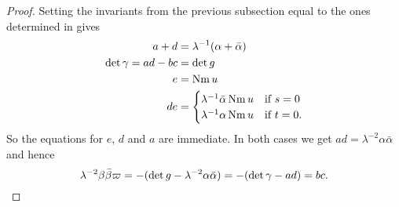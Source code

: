 \begin{proof}
  Setting the invariants from the previous subsection equal
  to the ones determined in  gives
  \begin{align*}
    a + d &= \lambda^{-1} (\alpha + \bar\alpha) \\
    \det \gamma = ad - bc &= \det g \\
    e &= \operatorname{Nm} u \\
    de &= \begin{cases}
      \lambda^{-1} \bar\alpha \operatorname{Nm} u & \text{if } s = 0 \\
      \lambda^{-1} \alpha \operatorname{Nm} u & \text{if } t = 0.
    \end{cases}
  \end{align*}
  So the equations for $e$, $d$ and $a$ are immediate.
  In both cases we get $ad = \lambda^{-2} \alpha \bar \alpha$ and hence
  \[ \lambda^{-2} \beta \bar \beta \varpi
    = -(\det g -  \lambda^{-2} \alpha \bar \alpha)
    = -(\det \gamma - ad) = bc. \qedhere \]
\end{proof}

